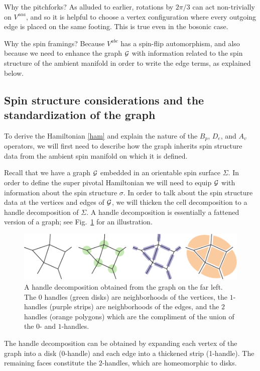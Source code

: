 Why the pitchforks? As alluded to earlier, rotations by $2\pi/3$ can act non-trivially on $V^{aaa}$, and so it is helpful to choose a vertex configuration where every outgoing edge is placed on the same footing. 
This is true even in the bosonic case.

Why the spin framings?
Because $V^{abc}$ has a spin-flip automorphism, and also because we need to 
enhance the graph $\mathcal{G}$ with information related to the spin structure of the ambient manifold 
in order to write the edge terms, as explained below.
















\subsection{Spin structure considerations and the standardization of the graph} \label{standardized_handles}


To derive the Hamiltonian \eqref{ham} and explain the nature of the $B_p$, $D_e$, and $A_v$ operators, we will first need to describe how the graph inherits spin structure data from the ambient spin manifold on which it is defined. 

Recall that we have a graph $\mathcal{G}$ embedded in an orientable spin surface $\Sigma$.
In order to define the super pivotal Hamiltonian we will need to equip $\mathcal{G}$ with information about the spin structure $\sigma$. 
In order to talk about the spin structure data at the vertices and edges of $\mathcal{G}$, we will thicken the cell decomposition to a handle decomposition of $\Sigma$.
A handle decomposition is essentially a fattened version of a graph; see Fig.~\ref{HandleDecomposition} for an illustration.
\begin{figure}
  \includegraphics{HandleDecomposition.pdf}
  \caption{A handle decomposition obtained from the graph on the far left.
  The $0$ handles (green disks) are neighborhoods of the vertices, the $1$-handles (purple strips) are neighborhoods of the edges, 
  and the $2$ handles (orange polygons) which are the compliment of the union of the $0$- and $1$-handles.}
  \label{HandleDecomposition}
\end{figure}
The handle decomposition can be obtained by expanding each vertex of the graph into a disk ($0$-handle) and each edge into
a thickened strip (1-handle).
The remaining faces constitute the $2$-handles, which are homeomorphic to disks.

